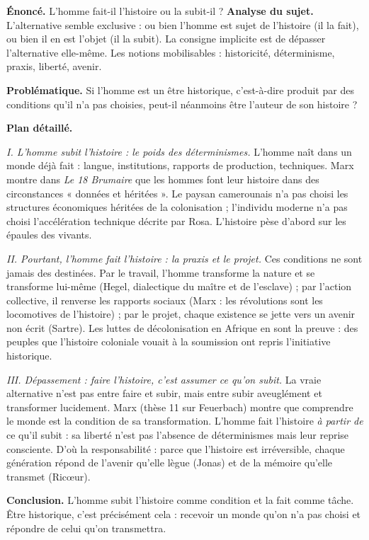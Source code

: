 \documentclass[11pt]{article}
\begin{document}
\begin{exoresolu}
\textbf{Énoncé.} L'homme fait-il l'histoire ou la subit-il ?
\tcblower
\textbf{Analyse du sujet.} L'alternative semble exclusive : ou bien l'homme est sujet de l'histoire (il la fait), ou bien il en est l'objet (il la subit). La consigne implicite est de dépasser l'alternative elle-même. Les notions mobilisables : historicité, déterminisme, praxis, liberté, avenir.

\textbf{Problématique.} Si l'homme est un être historique, c'est-à-dire produit par des conditions qu'il n'a pas choisies, peut-il néanmoins être l'auteur de son histoire ?

\textbf{Plan détaillé.}

\emph{I. L'homme subit l'histoire : le poids des déterminismes.}
L'homme naît dans un monde déjà fait : langue, institutions, rapports de production, techniques. Marx montre dans \emph{Le 18 Brumaire} que les hommes font leur histoire dans des circonstances « données et héritées ». Le paysan camerounais n'a pas choisi les structures économiques héritées de la colonisation ; l'individu moderne n'a pas choisi l'accélération technique décrite par Rosa. L'histoire pèse d'abord sur les épaules des vivants.

\emph{II. Pourtant, l'homme fait l'histoire : la praxis et le projet.}
Ces conditions ne sont jamais des destinées. Par le travail, l'homme transforme la nature et se transforme lui-même (Hegel, dialectique du maître et de l'esclave) ; par l'action collective, il renverse les rapports sociaux (Marx : les révolutions sont les locomotives de l'histoire) ; par le projet, chaque existence se jette vers un avenir non écrit (Sartre). Les luttes de décolonisation en Afrique en sont la preuve : des peuples que l'histoire coloniale vouait à la soumission ont repris l'initiative historique.

\emph{III. Dépassement : faire l'histoire, c'est assumer ce qu'on subit.}
La vraie alternative n'est pas entre faire et subir, mais entre subir aveuglément et transformer lucidement. Marx (thèse 11 sur Feuerbach) montre que comprendre le monde est la condition de sa transformation. L'homme fait l'histoire \emph{à partir de} ce qu'il subit : sa liberté n'est pas l'absence de déterminismes mais leur reprise consciente. D'où la responsabilité : parce que l'histoire est irréversible, chaque génération répond de l'avenir qu'elle lègue (Jonas) et de la mémoire qu'elle transmet (Ricœur).

\textbf{Conclusion.} L'homme subit l'histoire comme condition et la fait comme tâche. Être historique, c'est précisément cela : recevoir un monde qu'on n'a pas choisi et répondre de celui qu'on transmettra.
\end{exoresolu}
\end{document}
